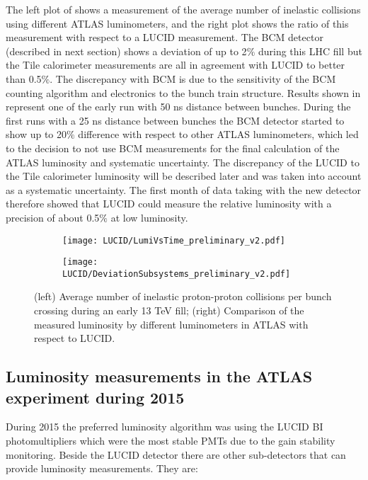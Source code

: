 The left plot of  shows a measurement of the average number of inelastic \pp collisions 
using different ATLAS 
luminometers, and the right plot shows the ratio of this measurement with respect to a LUCID measurement. The BCM 
detector (described in next section) shows a deviation of up to 2$\%$ during this LHC fill but the Tile calorimeter measurements are all in agreement 
with LUCID to better than 0.5$\%$.
The discrepancy with BCM is due to the sensitivity of the BCM counting algorithm and electronics to the bunch train structure.
Results shown in  represent one of the early run with 50 ns distance between bunches.
During the first runs with a 25 ns distance between bunches the BCM detector started to show up to 20$\%$ difference 
with respect to other ATLAS luminometers, which led to the decision to not use BCM measurements for the final calculation of the ATLAS luminosity and systematic uncertainty.
The discrepancy of the LUCID to the Tile calorimeter luminosity will be described later and was taken into account as a systematic uncertainty.
The first month of data taking with the new detector therefore showed that LUCID could measure the relative 
luminosity with a precision of about 0.5$\%$ at low luminosity.

\begin{figure}
\centering
\begin{subfigure}{.5\textwidth}
  \centering
  \texttt{[image: LUCID/LumiVsTime\_preliminary\_v2.pdf]}
  \label{fig:sub3}
\end{subfigure}%
\begin{subfigure}{.5\textwidth}
  \centering
  \texttt{[image: LUCID/DeviationSubsystems\_preliminary\_v2.pdf]}
  \label{fig:sub4}
\end{subfigure}
\caption{(left) Average number of inelastic proton-proton collisions per bunch crossing during an early 13 TeV fill; 
(right) Comparison of the measured luminosity by different luminometers in ATLAS with respect to LUCID.}
\label{fig:LumiVsTime}
\end{figure}

\subsection{Luminosity measurements in the ATLAS experiment during 2015}
\label{subsec:lumi_2015_2016}
During 2015 the preferred luminosity algorithm was using the LUCID BI photomultipliers which were the most stable PMTs due to the gain stability monitoring.
Beside the LUCID detector there are other sub-detectors that can provide luminosity measurements. They are: 

